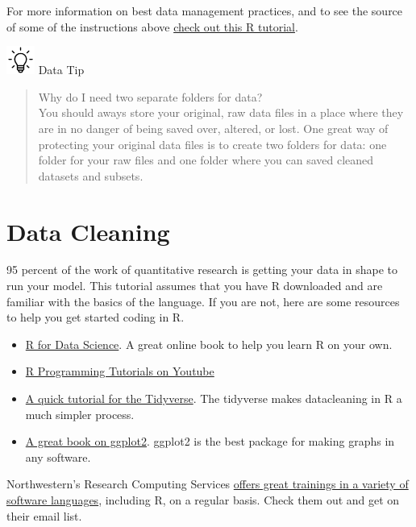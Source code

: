 \documentclass[
]{book}
\providecommand{\tightlist}{%
  \setlength{\itemsep}{0pt}\setlength{\parskip}{0pt}}
\begin{document}
For more information on best data management practices, and to see the source of some of the instructions above \href{https://swcarpentry.github.io/r-novice-gapminder/02-project-intro/index.html}{check out this R tutorial}.

\includegraphics[width=0.36458in,height=\textheight]{images/bulb.png} Data Tip

\begin{quote}
Why do I need two separate folders for data?\\
You should aways store your original, raw data files in a place where they are in no danger of being saved over, altered, or lost. One great way of protecting your original data files is to create two folders for data: one folder for your raw files and one folder where you can saved cleaned datasets and subsets.
\end{quote}

\hypertarget{data-cleaning-1}{%
\section{Data Cleaning}\label{data-cleaning-1}}

95 percent of the work of quantitative research is getting your data in shape to run your model. This tutorial assumes that you have R downloaded and are familiar with the basics of the language. If you are not, here are some resources to help you get started coding in R.

\begin{itemize}
\tightlist
\item
  \href{https://r4ds.had.co.nz/}{R for Data Science}. A great online book to help you learn R on your own.
\item
  \href{https://www.youtube.com/playlist?list=PL6gx4Cwl9DGCzVMGCPi1kwvABu7eWv08P}{R Programming Tutorials on Youtube}
\item
  \href{https://www.r-bloggers.com/2021/04/tidyverse-in-r-complete-tutorial/}{A quick tutorial for the Tidyverse}. The tidyverse makes datacleaning in R a much simpler process.
\item
  \href{https://ggplot2-book.org/index.html}{A great book on ggplot2}. ggplot2 is the best package for making graphs in any software.
\end{itemize}

Northwestern's Research Computing Services \href{https://www.it.northwestern.edu/research/training.html}{offers great trainings in a variety of software languages}, including R, on a regular basis. Check them out and get on their email list.
\end{document}

